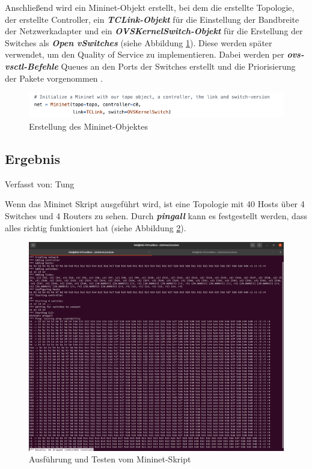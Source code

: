 \documentclass[fontsize=12pt,paper=a4,open=any,parskip=half,
  twoside=false,toc=listof,toc=bibliography,fleqn,leqno,
  captions=nooneline,captions=tableabove,british]{scrbook}
\begin{document}
Anschließend wird ein Mininet-Objekt erstellt, bei dem die erstellte Topologie, der erstellte Controller, ein \textit{\textbf{TCLink-Objekt}} für die Einstellung der Bandbreite der Netzwerkadapter und ein \textit{\textbf{OVSKernelSwitch-Objekt}} für die Erstellung der Switches als \textit{\textbf{Open vSwitches}} (siehe Abbildung \ref{mininet6}). Diese werden später verwendet, um den Quality of Service zu implementieren. Dabei werden per \textit{\textbf{ovs-vsctl-Befehle}} Queues an den Ports der Switches erstellt und die Priorisierung der Pakete vorgenommen \cite{qosovs}.

\begin{figure}[H]
 \centering
 \includegraphics[width=1.0\textwidth]{Bilder/mininet6}
 \captionsetup{justification=centering,margin=1cm}
 \caption{Erstellung des Mininet-Objektes}
 \label{mininet6}
\end{figure}

\subsection{Ergebnis}
{\tiny Verfasst von: Tung\par}
Wenn das Mininet Skript ausgeführt wird, ist eine Topologie mit 40 Hosts über 4 Switches und 4 Routers zu sehen. Durch \textit{\textbf{pingall}} kann es festgestellt werden, dass alles richtig funktioniert hat (siehe Abbildung \ref{pingall}).

\begin{figure}[H]
 \centering
 \includegraphics[width=1.0\textwidth]{Bilder/pingall}
 \captionsetup{justification=centering,margin=1cm}
 \caption{Ausführung und Testen vom Mininet-Skript}
 \label{pingall}
\end{figure}
\end{document}
